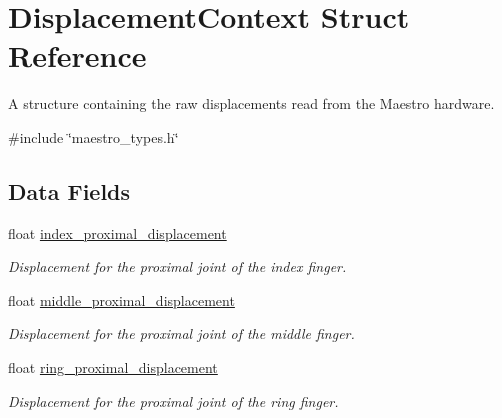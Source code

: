 \hypertarget{struct_displacement_context}{}\section{Displacement\+Context Struct Reference}
\label{struct_displacement_context}


A structure containing the raw displacements read from the Maestro hardware.  




{\ttfamily \#include \char`\"{}maestro\+\_\+types.\+h\char`\"{}}

\subsection*{Data Fields}
\begin{DoxyCompactItemize}
\item 
\mbox{\label{struct_displacement_context_af3083c1881d82ac3ef96443c1a7c1dc6}} 
float \hyperlink{struct_displacement_context_af3083c1881d82ac3ef96443c1a7c1dc6}{index\+\_\+proximal\+\_\+displacement}
\begin{DoxyCompactList}\small\item\em Displacement for the proximal joint of the index finger. \end{DoxyCompactList}\item 
\mbox{\label{struct_displacement_context_a8a3c74099b4f6364da5f87e0cbf43d03}} 
float \hyperlink{struct_displacement_context_a8a3c74099b4f6364da5f87e0cbf43d03}{middle\+\_\+proximal\+\_\+displacement}
\begin{DoxyCompactList}\small\item\em Displacement for the proximal joint of the middle finger. \end{DoxyCompactList}\item 
\mbox{\label{struct_displacement_context_ac72e95815a8c8f53df07592c75cbdd2d}} 
float \hyperlink{struct_displacement_context_ac72e95815a8c8f53df07592c75cbdd2d}{ring\+\_\+proximal\+\_\+displacement}
\begin{DoxyCompactList}\small\item\em Displacement for the proximal joint of the ring finger. \end{DoxyCompactList}\item 

\end{DoxyCompactItemize}
